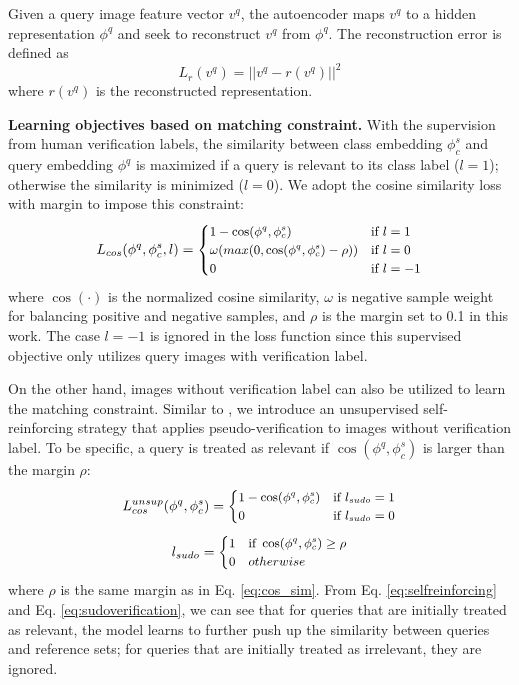 \documentclass[10pt,twocolumn,letterpaper]{article}
\begin{document}
Given a query image feature vector $v^q$, the autoencoder maps $v^q$ to a hidden representation $\phi^q$ and seek to reconstruct $v^q$ from $\phi^q$. The reconstruction error is defined as
\begin{equation}
L_{r}(v^q) = {||v^q-r(v^q)||}^2
\label{autoencoder}
\end{equation}
where $r(v^q)$ is the reconstructed representation.

\noindent
\textbf{Learning objectives based on matching constraint.} With the supervision from human verification labels, the similarity between class embedding $\phi_c^s$ and query embedding $\phi^q$ is maximized if a query is relevant to its class label ($l=1$); otherwise the similarity is minimized ($l=0$). We adopt the cosine similarity loss with margin to impose this constraint:
\begin{equation}
\small
L_{cos}(\phi^q, \phi_c^s, l) = 
\begin{cases}
    1-\cos(\phi^q, \phi_c^s)& \text{if } l=1\\
    \omega(max(0,\cos(\phi^q, \phi_c^s)-\rho))& \text{if } l=0 \\
    0 & \text{if } l=-1
\end{cases}
\label{eq:cos_sim}
\end{equation}
where $\cos(\cdot)$ is the normalized cosine similarity, $\omega$ is negative sample weight for balancing positive and negative samples, and $\rho$ is the margin set to 0.1 in this work. The case $l=-1$ is ignored in the loss function since this supervised objective only utilizes query images with verification label.

On the other hand, images without verification label can also be utilized to learn the matching constraint. Similar to \cite{tsai2017learning}, we introduce an unsupervised self-reinforcing strategy that applies pseudo-verification to images without verification label. To be specific, a query is treated as relevant if $\cos(\phi^q, \phi_c^s)$ is larger than the margin $\rho$: 
\begin{equation}
\small
L_{cos}^{unsup}(\phi^q, \phi_c^s) = 
\begin{cases}
    1-\cos(\phi^q, \phi_c^s)& \text{if } l_{sudo}=1\\
    0& \text{if } l_{sudo}=0
\end{cases}
\label{eq:selfreinforcing}
\end{equation}
\begin{equation}
\small
l_{sudo} = 
\begin{cases}
    1& \text{if } \cos(\phi^q, \phi_c^s) \geq \rho\\
    0& otherwise
\end{cases}
\label{eq:sudoverification}
\end{equation}
where $\rho$ is the same margin as in Eq. \eqref{eq:cos_sim}. From Eq. \eqref{eq:selfreinforcing} and Eq. \eqref{eq:sudoverification}, we can see that for queries that are initially treated as relevant, the model learns to further push up the similarity between queries and reference sets; for queries that are initially treated as irrelevant, they are ignored.
\end{document}
